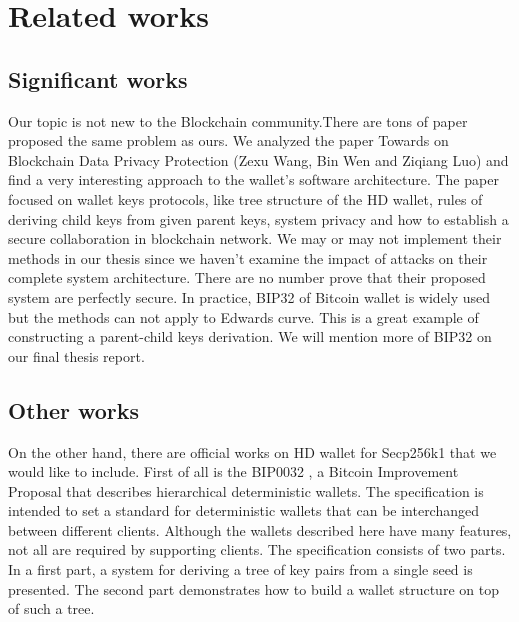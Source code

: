 \chapter{Related works}\label{chap: Related works}
\minitoc


\section{Significant works}
Our topic is not new to the Blockchain community.There are tons of paper proposed the same problem as ours. We analyzed the paper Towards on Blockchain Data Privacy Protection (Zexu Wang, Bin Wen and Ziqiang Luo) and find a very interesting approach to the wallet's software architecture. The paper focused on wallet keys protocols, like tree structure of the HD wallet, rules of deriving child keys from given parent keys, system privacy and how to establish a secure collaboration in blockchain network.
We may or may not implement their methods in our thesis since we haven't examine the impact of attacks on their complete system architecture. There are no number prove that their proposed system are perfectly secure.
In practice, BIP32 of Bitcoin wallet is widely used but the methods can not apply to Edwards curve. 
This is a great example of constructing a parent-child keys derivation. We will mention more of BIP32 on our final thesis report.

\section{Other works}
On the other hand, there are official works on HD wallet for Secp256k1 that we would like to include. First of all is the BIP0032 \cite{github/bip0032}, a Bitcoin Improvement Proposal that describes hierarchical deterministic wallets. The specification is intended to set a standard for deterministic wallets that can be interchanged between different clients. Although the wallets described here have many features, not all are required by supporting clients. The specification consists of two parts. In a first part, a system for deriving a tree of key pairs from a single seed is presented. The second part demonstrates how to build a wallet structure on top of such a tree.